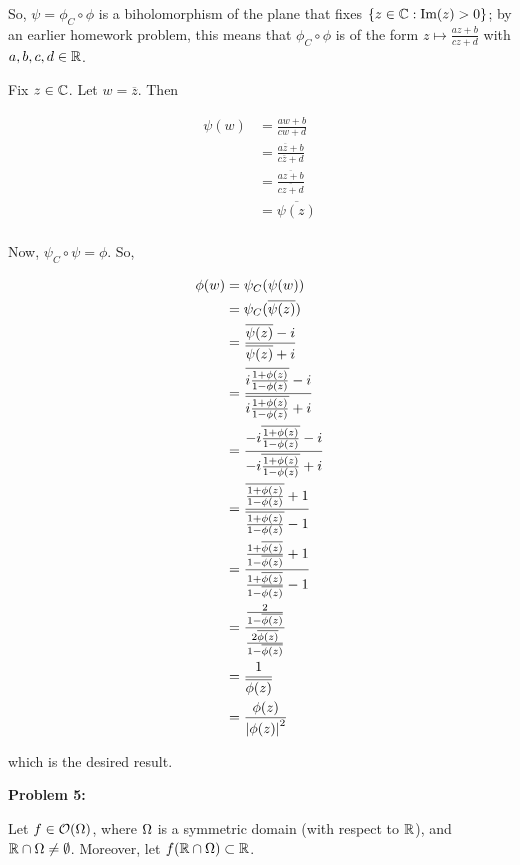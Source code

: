 \documentclass[a4paper,12pt]{article}
\begin{document}
So, $\psi = \phi_C \circ \phi$ is a biholomorphism of the plane that fixes $\{z\in \mathbb{C}:\text{Im}(z)>0\}$; by an earlier homework problem, this means that $\phi_C \circ \phi$ is of the form $z \mapsto \frac{az+b}{cz+d}$ with $a,b,c,d \in \mathbb{R}$.

Fix $z \in \mathbb{C}$. Let $w = \overline{z}$. Then

\begin{align*}
\psi(w) &= \frac{aw+b}{cw+d}\\
&= \frac{a\overline{z}+b}{c\overline{z}+d}\\
&= \frac{\overline{az+b}}{\overline{cz+d}}\\
&= \overline{\psi(z)}\\
\end{align*}

Now, $\psi_C \circ \psi = \phi$. So,

\begin{align*}
\phi(w) &= \psi_C(\psi(w))\\
&= \psi_C(\overline{\psi(z)})\\
&= \frac{\overline{\psi(z)}-i}{\overline{\psi(z)}+i}\\
&= \frac{\overline{i\frac{1+\phi(z)}{1-\phi(z)}}-i}{\overline{i\frac{1+\phi(z)}{1-\phi(z)}}+i}\\
&= \frac{-i\overline{\frac{1+\phi(z)}{1-\phi(z)}}-i}{-i\overline{\frac{1+\phi(z)}{1-\phi(z)}}+i}\\
&= \frac{\overline{\frac{1+\phi(z)}{1-\phi(z)}}+1}{\overline{\frac{1+\phi(z)}{1-\phi(z)}}-1}\\
&= \frac{\frac{1+\overline{\phi(z)}}{1-\overline{\phi(z)}}+1}{\frac{1+\overline{\phi(z)}}{1-\overline{\phi(z)}}-1}\\
&= \frac{\frac{2}{1-\overline{\phi(z)}}}{\frac{2\overline{\phi(z)}}{1-\overline{\phi(z)}}}\\
&=\frac{1}{\overline{\phi(z)}}\\
&=\frac{\phi(z)}{\left\lvert \phi(z) \right\rvert^2}\\
\end{align*}

which is the desired result.

\shunt

{\bf Problem 5:} %

Let $f \in \mathcal{O}(\Omega)$, where $\Omega$ is a symmetric domain (with respect to $\mathbb{R}$), and $\mathbb{R} \cap \Omega \neq \emptyset$. Moreover, let $f(\mathbb{R} \cap \Omega) \subset \mathbb{R}$.
\end{document}
